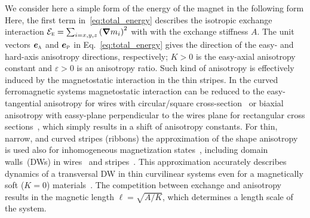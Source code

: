 We consider here a simple form of the energy of the magnet in the following form%
Here, the first term in~\eqref{eq:total_energy} describes the isotropic exchange interaction $\mathcal{E}_\textsc{e}=\sum_{i=x,y,z}\left(\vec{\nabla} m_i\right)^2$ with with the exchange stiffness $A$. The unit vectors $\vec{e}_\textsc{a}$ and $\vec{e}_\textsc{p}$ in Eq.~\eqref{eq:total_energy} gives the direction of the easy- and hard-axis anisotropy directions, respectively; $K>0$ is the easy-axial anisotropy constant and $\varepsilon>0$ is an anisotropy ratio. Such kind of anisotropy is effectively induced by the magnetostatic interaction in the thin stripes. In the curved ferromagnetic systems magnetostatic interaction can be reduced to the easy-tangential anisotropy for wires with circular/square cross-section~\cite{Slastikov12} or biaxial anisotropy with eassy-plane perpendicular to the wires plane for rectangular cross sections~\cite{Aharoni98,Gaididei17a}, which simply results in a shift of anisotropy constants. For thin, narrow, and curved stripes (ribbons) the approximation of the shape anisotropy is used also for inhomogeneous magnetization states~\cite{Gaididei17a}, including domain walls~(DWs) in wires~\cite{Yershov15b,Yershov16,Pylypovskyi16} and stripes~\cite{Yershov18a,Volkov19c}. This approximation accurately describes dynamics of a transversal DW in thin curvilinear systems even for a magnetically soft ($K = 0$) materials~\cite{Yershov15b,Yershov16,Pylypovskyi16,Yershov18a,Volkov19c}.  The competition between exchange and anisotropy results in the magnetic length $\ell=\sqrt{A/K}$, which determines a length scale of the system.%

